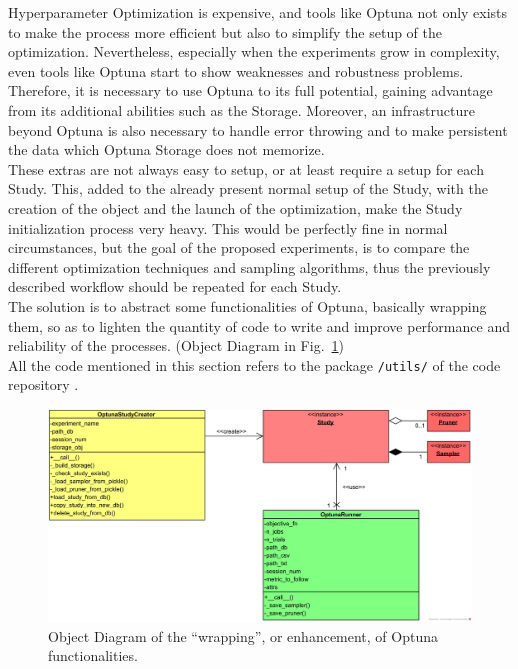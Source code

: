 Hyperparameter Optimization is expensive, and tools like Optuna not only exists to make the process more efficient but also to simplify the setup of the optimization.
Nevertheless, especially when the experiments grow in complexity, even tools like Optuna start to show weaknesses and robustness problems.
\\[0.3cm]Therefore, it is necessary to use Optuna to its full potential, gaining advantage from its additional abilities such as the Storage. Moreover, an infrastructure beyond Optuna is also necessary to handle error throwing and to make persistent the data which Optuna Storage does not memorize.
\\[0.3cm]These extras are not always easy to setup, or at least require a setup for each Study. This, added to the already present normal setup of the Study, with the creation of the object and the launch of the optimization, make the Study initialization process very heavy.
This would be perfectly fine in normal circumstances, but the goal of the proposed experiments, is to compare the different optimization techniques and sampling algorithms, thus the previously described workflow should be repeated for each Study.
\\[0.3cm]The solution is to abstract some functionalities of Optuna, basically wrapping them, so as to lighten the quantity of code to write and improve performance and reliability of the processes. (Object Diagram in Fig.~\ref{fig:figure-3.3.1})
\\[0.3cm]All the code mentioned in this section refers to the package \texttt{/utils/} of the code repository \cite{Repository-THESIS}.
\begin{figure}[t]
	\centering
	\includegraphics[width=15cm]{figures/figure-3.3.1.png}
	\caption[Object Diagram of Optuna Wrapping]{Object Diagram of the “wrapping”, or enhancement, of Optuna functionalities.}
	\label{fig:figure-3.3.1}
\end{figure}

